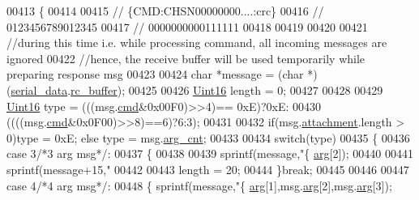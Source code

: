 \begin{DoxyCode}
00413 \{
00414   
00415     \textcolor{comment}{// \{CMD:CHSN00000000....:crc\}}
00416     \textcolor{comment}{// 0123456789012345}
00417     \textcolor{comment}{// 0000000000111111}
00418 
00419 
00420 
00421    \textcolor{comment}{//during this time i.e. while processing command, all incoming messages are ignored}
00422    \textcolor{comment}{//hence, the receive buffer will be used temporarily while preparing response msg}
00423 
00424    \textcolor{keywordtype}{char}   *message = (\textcolor{keywordtype}{char} *)(\hyperlink{a00030_a77d3b77ccd59a0065642bf1ac7887b9d}{serial\_data}.\hyperlink{a00030_ac734cb8be27f86bd99edc539434883a4}{rc\_buffer});
00425 
00426    \hyperlink{a00072_a59a9f6be4562c327cbfb4f7e8e18f08b}{Uint16}  length = 0;
00427 
00428 
00429   \hyperlink{a00072_a59a9f6be4562c327cbfb4f7e8e18f08b}{Uint16} type =  (((msg.\hyperlink{a00031_a13c351e37c82b2434e5ce4421012ffd6}{cmd}&0x00F0)>>4)== 0xE)?0xE:
00430                  ((((msg.\hyperlink{a00031_a13c351e37c82b2434e5ce4421012ffd6}{cmd}&0x0F00)>>8)==6)?6:3);
00431 
00432  \textcolor{keywordflow}{if}(msg.\hyperlink{a00031_a040f6d5d58d18d8aeaf447eda7f50172}{attachment}.length > 0)type = 0xE; \textcolor{keywordflow}{else} type = msg.\hyperlink{a00031_a7b79f40e2eeec288091afd340bf8f591}{arg\_cnt};
00433 
00434  \textcolor{keywordflow}{switch}(type)
00435    \{
00436        \textcolor{keywordflow}{case} 3\textcolor{comment}{/*3 arg msg*/}:
00437        \{
00438 
00439        sprintf(message,\textcolor{stringliteral}{"\{%
      \hyperlink{a00031_af7d6f762438c80072bd9dc0e4dd4ae1e}{arg}[2]);
00440 
00441        sprintf(message+15,\textcolor{stringliteral}{"%
00442 
00443        length = 20;
00444        \}\textcolor{keywordflow}{break};
00445 
00446 
00447        \textcolor{keywordflow}{case} 4\textcolor{comment}{/*4 arg msg*/}:
00448        \{    sprintf(message,\textcolor{stringliteral}{"\{%
      \hyperlink{a00031_af7d6f762438c80072bd9dc0e4dd4ae1e}{arg}[1],msg.\hyperlink{a00031_af7d6f762438c80072bd9dc0e4dd4ae1e}{arg}[2],msg.\hyperlink{a00031_af7d6f762438c80072bd9dc0e4dd4ae1e}{arg}[3]);
}}}
\end{DoxyCode}
